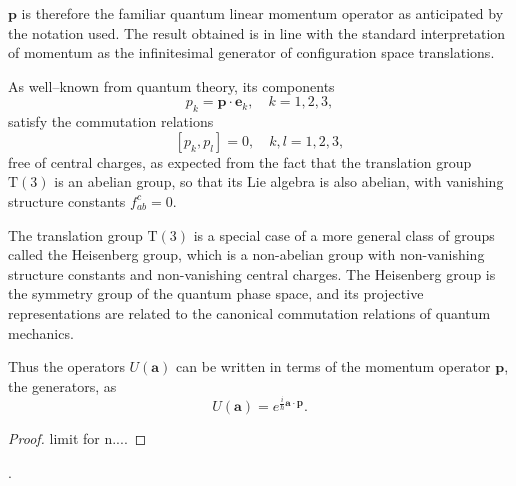 \begin{example}
    \(\mathbf{p}\) is therefore the familiar quantum linear momentum operator as anticipated by the notation used. The result obtained is in line with the standard interpretation of momentum as the infinitesimal generator of configuration space translations.

    As well–known from quantum theory, its components
    \[
        p_k = \mathbf{p} \cdot \mathbf{e}_k, \quad k = 1, 2, 3,
    \]
    satisfy the commutation relations
    \[
        [p_k, p_l] = 0, \quad k, l = 1, 2, 3,
    \]
    free of central charges, as expected from the fact that the translation group \(\mathrm{T}(3)\) is an abelian group, so that its Lie algebra is also abelian, with vanishing structure constants \(f^c_{ab} = 0\).

    The translation group \(\mathrm{T}(3)\) is a special case of a more general class of groups called the Heisenberg group, which is a non-abelian group with non-vanishing structure constants and non-vanishing central charges. The Heisenberg group is the symmetry group of the quantum phase space, and its projective representations are related to the canonical commutation relations of quantum mechanics.

    Thus the operators \(U(\mathbf{a})\) can be written in terms of the momentum operator \(\mathbf{p}\), the generators, as
    \[
        U(\mathbf{a}) = e^{\tfrac{i}{\hbar} \mathbf{a} \cdot \mathbf{p}}.
    \]
    \begin{proof}
        limit for n....
    \end{proof}


    .


\end{example}

